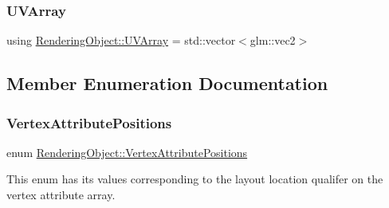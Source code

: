 \hypertarget{class_rendering_object_a504ecd45ebe36dfa5b78c46d64d9904a}{}\label{class_rendering_object_a504ecd45ebe36dfa5b78c46d64d9904a} 
\subsubsection{\texorpdfstring{U\+V\+Array}{UVArray}}
{\footnotesize\ttfamily using \hyperlink{class_rendering_object_a504ecd45ebe36dfa5b78c46d64d9904a}{Rendering\+Object\+::\+U\+V\+Array} =  std\+::vector$<$glm\+::vec2$>$}



\subsection{Member Enumeration Documentation}
\hypertarget{class_rendering_object_ab772f569ef63a1db07db29a744b519ee}{}\label{class_rendering_object_ab772f569ef63a1db07db29a744b519ee} 
\subsubsection{\texorpdfstring{Vertex\+Attribute\+Positions}{VertexAttributePositions}}
{\footnotesize\ttfamily enum \hyperlink{class_rendering_object_ab772f569ef63a1db07db29a744b519ee}{Rendering\+Object\+::\+Vertex\+Attribute\+Positions}\hspace{0.3cm}{\ttfamily [strong]}}



This enum has its values corresponding to the layout location qualifer on the vertex attribute array. 

